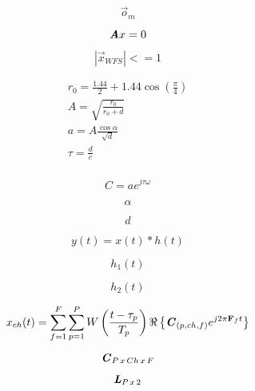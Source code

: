 \documentclass[10pt]{report}
\begin{document}
\begin{equation*}
	\vec{o}_{m}
\end{equation*}		
	
\begin{equation*}
\bm{\mathit{A}}x = 0
\end{equation*}

\begin{equation*}
|\vec{x}_{\mathit{WFS}}| <= 1
\end{equation*}

\begin{gather*}
	r_0 = \frac{1.44}{2} + 1.44 \cos\left( \frac{\pi}{4} \right)\\
	A = \sqrt{\frac{r_0}{r_0 + d}}\\
	a = A\frac{\cos\alpha}{\sqrt{d}}\\
	\tau = \frac{d}{c}\\
\end{gather*}	

\begin{equation*}
	C = a e^{j\tau \omega}
\end{equation*}

\begin{equation*}
	\alpha
\end{equation*}

\begin{equation*}
	d
\end{equation*}
	
\begin{equation*}
	y(t) = x(t)\ast h(t)
\end{equation*}

\begin{equation*}
	h_1(t)
\end{equation*}

\begin{equation*}
	h_2(t)
\end{equation*}

\begin{equation*}
	x_{ch}(t) = \sum_{f = 1}^{F} \sum_{p = 1}^{P} W\left(\frac{t - \tau_p}{T_p}\right)
	\Re \left\{ \bm{\mathit{C}}_{(p,ch,f)} e^{j 2 \pi \mathbf{F}_f t} \right\}
\end{equation*}

\begin{equation*}
	\bm{\mathit{C}}_{P \, x \, Ch \, x \, F}
\end{equation*}

\begin{equation*}
	\bm{\mathit{L}}_{P \, x \, 2}
\end{equation*}
\end{document}
